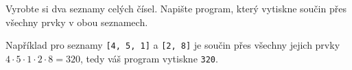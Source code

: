 \question[50]
Vyrobte si dva seznamy celých čísel. Napište program, který vytiskne součin přes
všechny prvky v obou seznamech.

Například pro seznamy \texttt{[4, 5, 1]} a \texttt{[2, 8]} je součin přes
všechny jejich prvky $4 \cdot 5 \cdot 1 \cdot 2 \cdot 8 = 320$, tedy váš program
vytiskne \texttt{320}.